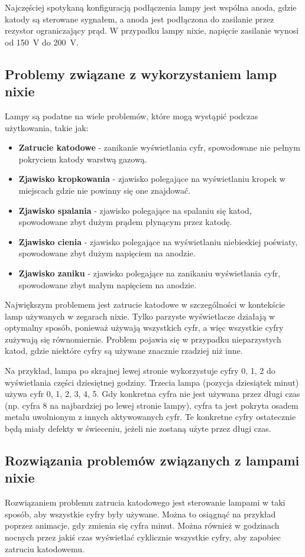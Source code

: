 \documentclass[../main.tex]{subfiles}
\begin{document}
Najczęściej spotykaną konfiguracją podłączenia lampy jest wspólna anoda, gdzie katody są sterowane sygnałem, a anoda jest podłączona
do zasilanie przez rezystor ograniczający prąd. W przypadku lampy nixie, napięcie zasilanie wynosi od \SI{150}{\volt} do \SI{200}{\volt}.

\subsection{Problemy związane z wykorzystaniem lamp nixie}

Lampy są podatne na wiele problemów, które mogą wystąpić podczas użytkowania, takie jak:
\begin{itemize}
  \item \textbf{Zatrucie katodowe} - zanikanie wyświetlania cyfr, spowodowane nie pełnym pokryciem katody warstwą gazową.
  \item \textbf{Zjawisko kropkowania} - zjawisko polegające na wyświetlaniu kropek w miejscach gdzie nie powinny się one znajdować.
  \item \textbf{Zjawisko spalania} - zjawisko polegające na spalaniu się katod, spowodowane zbyt dużym prądem płynącym przez katodę.
  \item \textbf{Zjawisko cienia} - zjawisko polegające na wyświetlaniu niebieskiej poświaty, spowodowane zbyt dużym napięciem na anodzie.
  \item \textbf{Zjawisko zaniku} - zjawisko polegające na zanikaniu wyświetlania cyfr, spowodowane zbyt małym napięciem na anodzie.
\end{itemize}

Największym problemem jest zatrucie katodowe w szczególności w kontekście lamp używanych w zegarach nixie. 
Tylko parzyste wyświetlacze działają w optymalny sposób, ponieważ używają wszystkich cyfr, 
a więc wszystkie cyfry zużywają się równomiernie.
Problem pojawia się w przypadku nieparzystych katod, gdzie niektóre cyfry są używane znacznie rzadziej niż inne.

Na przykład, lampa po skrajnej lewej stronie wykorzystuje cyfry 0, 1, 2 do wyświetlania części dziesiętnej godziny.
Trzecia lampa (pozycja dziesiątek minut) używa cyfr 0, 1, 2, 3, 4, 5. Gdy konkretna cyfra nie jest używana przez długi czas
 (np. cyfra 8 na najbardziej po lewej stronie lampy),
cyfra ta jest pokryta osadem metalu uwolnionym z innych aktywowanych cyfr.
 Te konkretne cyfry ostatecznie będą miały defekty w świeceniu, jeżeli nie zostaną użyte przez długi czas.

\subsection{Rozwiązania problemów związanych z lampami nixie}
Rozwiązaniem problemu zatrucia katodowego jest sterowanie lampami w taki sposób, aby wszystkie cyfry były używane.
Można to osiągnąć na przykład poprzez animacje, gdy zmienia się cyfra minut.
Można również w godzinach nocnych przez jakiś czas wyświetlać cyklicznie wszystkie cyfry, aby zapobiec zatruciu katodowemu.
\end{document}
